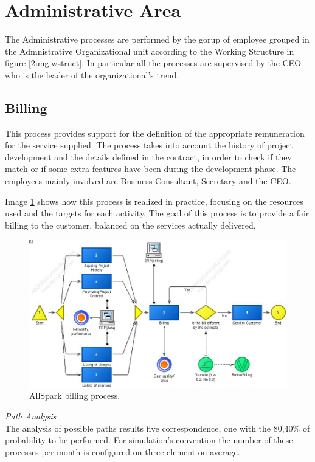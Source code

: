 \section{Administrative Area}
The Administrative processes are performed by the gorup of employee grouped in the Admnistrative Organizational unit according to the Working Structure in figure \ref{2img:wstruct}. In particular all the processes are supervised by the CEO who is the leader of the organizational's trend.


\subsection{Billing}
This process provides support for the definition of the appropriate
remuneration for the service supplied.
The process takes into account the history of project development and the details defined in the contract, in order to check if they match or if some extra features have been during the development phase. The employees mainly involved are Business Consultant, Secretary and the CEO.

Image \ref{2img:billing} shows how this process is realized in practice, focusing on the resources used and the targets for each activity. The goal of this process is to provide a fair billing to the customer, balanced on the services actually delivered.\\

\begin{figure}[ht!]
\begin{centering}
\includegraphics[scale=0.50, angle=90]{assign2/adonis/imgs/billing.jpg}
\caption{AllSpark billing process.}
\label{2img:billing}
\end{centering}
\end{figure}


\noindent
\emph{Path Analysis}\\
The analysis of possible paths results five correspondence, one with the 80,40\% of probability to be performed. For simulation's convention the number of these processes per month is configured on three element on average.

